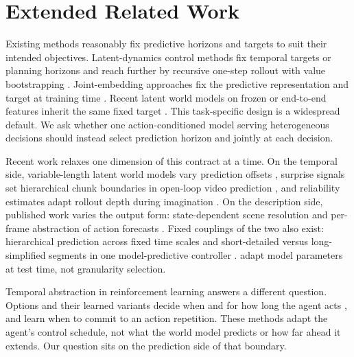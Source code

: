 \section{Extended Related Work}
\label{sec:app:related}

Existing methods reasonably fix predictive horizons and targets to suit their intended objectives. Latent-dynamics control methods fix temporal targets or planning horizons and reach further by recursive one-step rollout with value bootstrapping \citep{hafner2020dreamer,hansen2022tdmpc}. Joint-embedding approaches fix the predictive representation and target at training time \citep{assran2023ijepa,bardes2024vjepa}. Recent latent world models on frozen or end-to-end features inherit the same fixed target \citep{zhou2025dinowm,maes2026leworldmodel}. This task-specific design is a widespread default. We ask whether one action-conditioned model serving heterogeneous decisions should instead select prediction horizon and  jointly at each decision. 

Recent work relaxes one dimension of this contract at a time. On the temporal side, variable-length latent world models vary prediction offsets \citep{du2026vlwm}, surprise signals set hierarchical chunk boundaries in open-loop video prediction \citep{iiyama2026sunta}, and reliability estimates adapt rollout depth during imagination \citep{hafez2020improving}. On the description side, published work varies the output form: state-dependent scene resolution \citep{wang2023dynamic} and per-frame abstraction of action forecasts \citep{scarafoni2022islands}. Fixed couplings of the two also exist: hierarchical prediction across fixed time scales \citep{shaj2023multi,villarcorrales2022mspred} and short-detailed versus long-simplified segments in one model-predictive controller \citep{brudigam2021mpc}. \citet{wang2026adajepa} adapt model parameters at test time, not granularity selection. 

Temporal abstraction in reinforcement learning answers a different question. Options and their learned variants decide when and for how long the agent acts \citep{sutton1999options,bacon2017optioncritic}, and \citet{biedenkapp2021temporl} learn when to commit to an action repetition. These methods adapt the agent's control schedule, not what the world model predicts or how far ahead it extends. Our question sits on the prediction side of that boundary.

